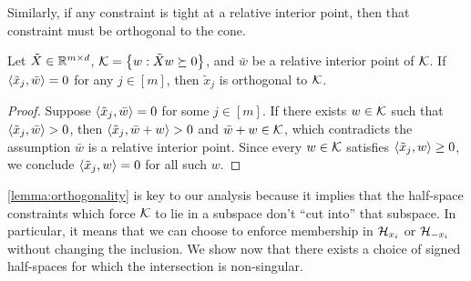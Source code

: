 Similarly, if any constraint is tight at a relative interior point, then that constraint must be orthogonal to the cone.

\begin{lemma}\label{lemma:tight-constraints}
    Let \( \tilde X \in \mathbb{R}^{m \times d} \), \( \mathcal{K} = \left\{ w : \tilde X w \succeq 0\right\} \), and \( \bar w \) be a relative interior point of \( \mathcal{K} \).
    If \( \left\langle\tilde x_j, \bar w\right\rangle = 0 \) for any \( j \in [m] \), then \( \tilde x_j \) is orthogonal to \( \mathcal{K} \).
\end{lemma}
\begin{proof}
    Suppose \( \left\langle\tilde x_j, \bar w\right\rangle = 0 \) for some \( j \in [m] \).
    If there exists \( w \in \mathcal{K} \) such that \( \left\langle\tilde x_j, \bar w\right\rangle > 0 \), then \( \left\langle\tilde x_j, \bar w + w\right\rangle > 0 \) and \( \bar w + w \in \mathcal{K} \), which contradicts the assumption \( \bar w \) is a relative interior point.
    Since every \( w \in \mathcal{K} \) satisfies \( \left\langle\tilde x_j, w\right\rangle \geq 0 \), we conclude \( \left\langle\tilde x_j, w\right\rangle = 0 \) for all such \( w \).
\end{proof}

\cref{lemma:orthogonality} is key to our analysis because it implies that the half-space constraints which force \( \mathcal{K} \) to lie in a subspace don't ``cut into'' that subspace.
In particular, it means that we can choose to enforce membership in \( \mathcal{H}_{x_i} \) or \( \mathcal{H}_{- x_i} \) without changing the inclusion.
We show now that there exists a choice of signed half-spaces for which the intersection is non-singular.

